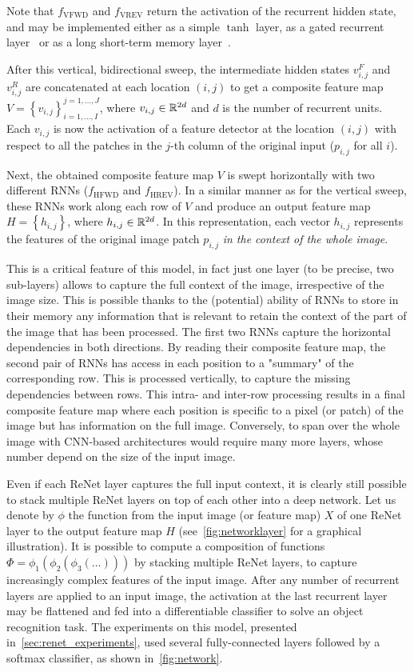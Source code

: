 Note that $f_{\text{VFWD}}$ and $f_{\text{VREV}}$ return the activation of the
recurrent hidden state, and may be implemented either as a simple $\tanh$ layer,
as a gated recurrent layer~\citep{Cho2014} or as a long short-term memory
layer~\citep{Hochreiter+Schmidhuber-1997}.

After this vertical, bidirectional sweep, the intermediate hidden states
$v^F_{i,j}$ and $v^R_{i,j}$ are concatenated at each location $(i,j)$ to get a
composite feature map $V= \left\{ v_{i,j} \right\}_{i=1,\ldots,I}^{
j=1,\ldots,J}$, where $v_{i,j} \in \mathbb{R}^{2d}$ and $d$ is the number of recurrent
units.  Each $v_{i,j}$ is now the activation of a feature detector at the
location $(i,j)$ with respect to all the patches in the $j$-th column of the
original input ($p_{i, j}$ for all $i$).

Next, the obtained composite feature map $V$ is swept horizontally with two
different RNNs ($f_{\text{HFWD}}$ and $f_{\text{HREV}}$). In a similar manner
as for the vertical sweep, these RNNs work along each row of $V$ and produce an
output feature map $H = \left\{ h_{i,j} \right\}$, where $h_{i,j} \in
\mathbb{R}^{2d}$. In this representation, each vector $h_{i,j}$ represents the
features of the original image patch $p_{i,j}$ \emph{in the context of the
whole image}.

This is a critical feature of this model, in fact just one layer (to be
precise, two sub-layers) allows to capture the full context of the image,
irrespective of the image size. This is possible thanks to the (potential)
ability of RNNs to store in their memory any information that is relevant to
retain the context of the part of the image that has been processed. The first
two RNNs capture the horizontal dependencies in both directions. By reading
their composite feature map, the second pair of RNNs has access in each
position to a "summary" of the corresponding row. This is processed vertically,
to capture the missing dependencies between rows. This intra- and inter-row
processing results in a final composite feature map where each position is
specific to a pixel (or patch) of the image but has information on the full
image. Conversely, to span over the whole image with CNN-based architectures
would require many more layers, whose number depend on the size of the input
image.

Even if each ReNet layer captures the full input context, it is clearly still
possible to stack multiple ReNet layers on top of each other into a deep
network. Let us denote by $\phi$ the function from the input image (or feature
map) $X$ of one ReNet layer to the output feature map $H$
(see~\autoref{fig:networklayer} for a graphical illustration). It is possible
to compute a composition of functions $\Phi = \phi_1(\phi_2(\phi_3(\dots)))$ by
stacking multiple ReNet layers, to capture increasingly complex features of the
input image.  After any number of recurrent layers are applied to an input
image, the activation at the last recurrent layer may be flattened and fed into
a differentiable classifier to solve an object recognition task. The
experiments on this model, presented in~\autoref{sec:renet_experiments}, used
several fully-connected layers followed by a softmax classifier, as shown
in~\autoref{fig:network}.

